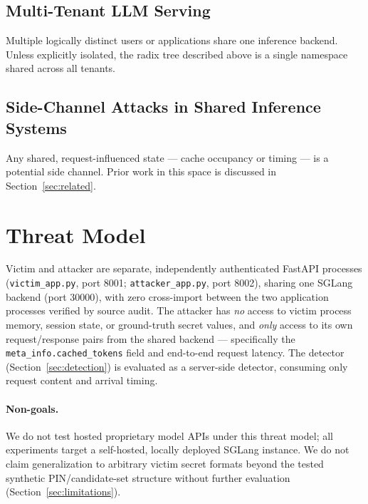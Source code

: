 \documentclass[11pt]{article}
\begin{document}
\subsection{Multi-Tenant LLM Serving}
Multiple logically distinct users or applications share one inference
backend. Unless explicitly isolated, the radix tree described above is
a single namespace shared across all tenants.

\subsection{Side-Channel Attacks in Shared Inference Systems}
Any shared, request-influenced state --- cache occupancy or timing ---
is a potential side channel. Prior work in this space is discussed in
Section~\ref{sec:related}.

\section{Threat Model}
\label{sec:threat}
Victim and attacker are separate, independently authenticated FastAPI
processes (\texttt{victim\_app.py}, port 8001; \texttt{attacker\_app.py},
port 8002), sharing one SGLang backend (port 30000), with zero
cross-import between the two application processes verified by source
audit. The attacker has \emph{no} access to victim process memory,
session state, or ground-truth secret values, and \emph{only} access to
its own request/response pairs from the shared backend --- specifically
the \texttt{meta\_info.cached\_tokens} field and end-to-end request
latency. The detector (Section~\ref{sec:detection}) is evaluated as a
server-side detector, consuming only request content and arrival
timing.

\paragraph{Non-goals.} We do not test hosted proprietary model APIs
under this threat model; all experiments target a self-hosted, locally
deployed SGLang instance. We do not claim generalization to arbitrary
victim secret formats beyond the tested synthetic PIN/candidate-set
structure without further evaluation (Section~\ref{sec:limitations}).
\end{document}
